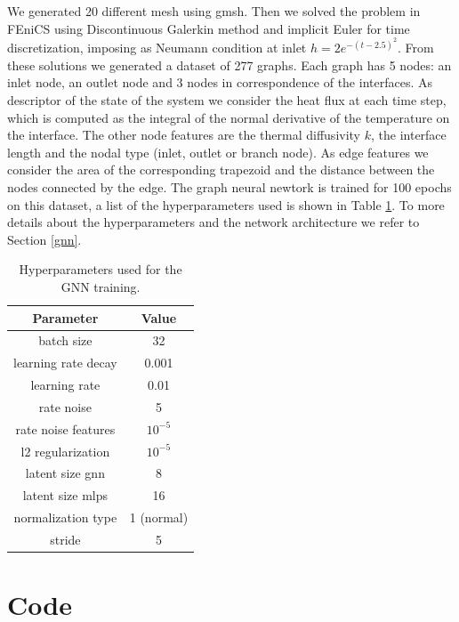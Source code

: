 \documentclass[11pt,a4paper]{article}
\begin{document}
We generated 20 different mesh using gmsh. 
Then we solved the problem in FEniCS using Discontinuous Galerkin method and implicit Euler for time discretization, imposing as Neumann condition at inlet \(h = 2e^{-(t-2.5)^2}\).
From these solutions we generated a dataset of 277 graphs. 
Each graph has 5 nodes: an inlet node, an outlet node and 3 nodes in correspondence of the interfaces. 
As descriptor of the state of the system we consider the heat flux at each time step, which is computed as the integral of the normal derivative of the temperature on the interface. The other node features are the thermal diffusivity \(k\), the interface length and the nodal type (inlet, outlet or branch node). 
As edge features we consider the area of the corresponding trapezoid and the distance between the nodes connected by the edge. 
The graph neural newtork is trained for 100 epochs on this dataset, a list of the hyperparameters used is shown in Table \ref{hyperparams}. To more details about the hyperparameters and the network architecture we refer to Section \ref{gnn}.

\begin{table}[H]
    \centering
    \begin{tabular}{|c|c|}
        \hline
        \textbf{Parameter} & \textbf{Value} \\
        \hline
        batch size & 32 \\
        learning rate decay & 0.001 \\
        learning rate & 0.01 \\
        rate noise & 5 \\
        rate noise features & \(10^{-5}\) \\
        l2 regularization & \(10^{-5}\) \\
        latent size gnn & 8 \\
        latent size mlps & 16\\
        normalization type & 1 (normal) \\
        stride & 5 \\
        \hline   
    \end{tabular}
    \caption{Hyperparameters used for the GNN training.}
    \label{hyperparams}
\end{table}


\section{Code}
\end{document}
